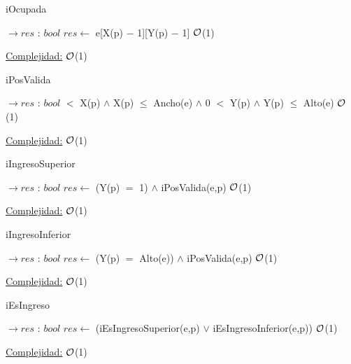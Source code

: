 \begin{Representacion}
\begin{Algoritmos}
	\begin{algorithm}
		\caption{iOcupada}
		\begin{algorithmic}[1]
			 $\to res$ : $bool$	
				\State $res \gets$ e[X(p) $-$ 1][Y(p) $-$ 1] \Comment $\mathcal{O}$(1)
			\EndProcedure		
		\end{algorithmic}
		\underline{Complejidad:} $\mathcal{O}$(1)
	\end{algorithm}
	
	\begin{algorithm}
		\caption{iPosValida}
		\begin{algorithmic}
			 $\to res$ : $bool$
				 $<$ X(p) $\land$ X(p) $\leq$ Ancho(e) $\land$ 0 $<$ Y(p) $\land$ Y(p) $\leq$ Alto(e) \Comment $\mathcal{O}$(1)
			\EndProcedure		
		\end{algorithmic}
		\underline{Complejidad:} $\mathcal{O}$(1)
	\end{algorithm}

	\begin{algorithm}[H]
		\caption{iIngresoSuperior}
		\begin{algorithmic}[1]
			 $\to res$ : $bool$
				\State $res \gets$ (Y(p) $=$ 1) $\land$ iPosValida(e,p) \Comment $\mathcal{O}$(1)		
			\EndProcedure		
		\end{algorithmic}
		\underline{Complejidad:} $\mathcal{O}$(1)
	\end{algorithm}
	
	\begin{algorithm}[H]
		\caption{iIngresoInferior}
		\begin{algorithmic}[1]
			 $\to res$ : $bool$
				\State $res \gets$ (Y(p) $=$ Alto(e)) $\land$ iPosValida(e,p) \Comment $\mathcal{O}$(1)		
			\EndProcedure		
		\end{algorithmic}
		\underline{Complejidad:} $\mathcal{O}$(1)
	\end{algorithm}
	
	\begin{algorithm}[H]
		\caption{iEsIngreso}
		\begin{algorithmic}[1]
			 $\to res$ : $bool$
				\State $res \gets$ (iEsIngresoSuperior(e,p) $\lor$ iEsIngresoInferior(e,p)) \Comment $\mathcal{O}$(1)
			\EndProcedure		
		\end{algorithmic}
		\underline{Complejidad:} $\mathcal{O}$(1)
	\end{algorithm}
	

\end{Algoritmos}
\end{Representacion}
